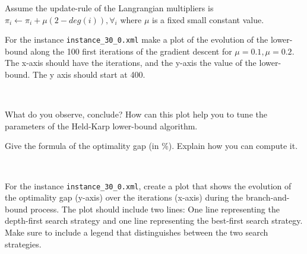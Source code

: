 \documentclass[12pt]{report}
\newcommand{\answerbox}[2]{\hfill\break\\
        \framebox[\linewidth]{\parbox[c][#1][c]{\dimexpr\linewidth-2\fboxsep-2\fboxrule}{#2}}
}
\begin{document}
\begin{Exercise}[title={Held and Karp lower-bound}]

Assume the update-rule of the Langrangian multipliers is $\pi_i \leftarrow \pi_i + \mu (2-deg(i)) , \forall_i$ 
where $\mu$ is a fixed small constant value.

\Question For the instance \verb|instance_30_0.xml| make a plot of the evolution of the lower-bound along the 100 first iterations of the gradient descent
for $\mu =0.1, \mu = 0.2$. The x-axis should have the iterations, and the y-axis the value of the lower-bound.
The y axis should start at 400.

\answerbox{12cm}{
}


\Question What do you observe, conclude? How can this plot help you to tune the parameters of the Held-Karp lower-bound algorithm.
\answerbox{4cm}{
}



\end{Exercise}

\pagebreak

\begin{Exercise}[title={Optimality Gap}]

\Question Give the formula of the optimality gap (in \%). Explain how you can compute it.

\answerbox{4cm}{
}


\Question For the instance \verb|instance_30_0.xml|, create a plot that shows the evolution of the optimality gap (y-axis) over the iterations (x-axis) during the branch-and-bound process. The plot should include two lines: One line representing the depth-first search strategy and one line representing the best-first search strategy. Make sure to include a legend that distinguishes between the two search strategies.

\answerbox{12cm}{
}


\end{Exercise}
\end{document}
